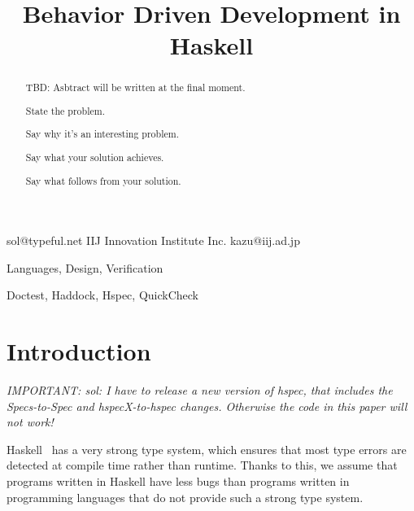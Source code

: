 \documentclass[preprint]{sigplanconf}
\begin{document}
\copyrightdata{[to be supplied]}


\title{Behavior Driven Development in Haskell}

           {}
           {sol@typeful.net}
           {IIJ Innovation Institute Inc.}
           {kazu@iij.ad.jp}

\maketitle

\begin{abstract}

TBD: Asbtract will be written at the final moment.

State the problem.

Say why it’s an interesting problem.

Say what your solution achieves.

Say what follows from your solution.

\end{abstract}


\terms Languages, Design, Verification

\keywords Doctest, Haddock, Hspec, QuickCheck

\section{Introduction}

\emph{IMPORTANT: sol: I have to release a new version of hspec, that
includes the Specs-to-Spec and hspecX-to-hspec changes.  Otherwise the
code in this paper will not work!}


Haskell~\cite{haskell} has a very strong type system, which ensures that most type errors are
detected at compile time rather than runtime.  Thanks to this, we assume that
programs written in Haskell have less bugs than programs written in programming
languages that do not provide such a strong type system.
\end{document}
